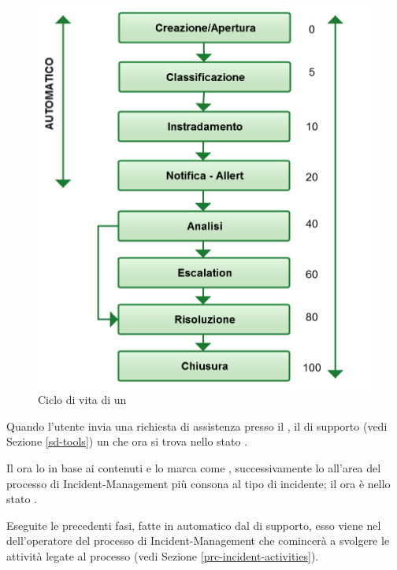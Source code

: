 \begin{figure}[htbp]
\centering
\includegraphics[scale=0.4]{Images/Diagrams/Ticket_life_cycle.png}
\caption{Ciclo di vita di un }
\label{prc-incident-status-img}
\end{figure}

Quando l'utente invia una richiesta di assistenza presso il , il  di supporto (vedi Sezione \ref{sd-tools})  un  che ora si trova nello stato .

Il  ora lo  in base ai contenuti e lo marca come , successivamente lo  all'area del processo di \ac{Incident-Management} più consona al tipo di incidente; il  ora è nello stato .

Eseguite le precedenti fasi, fatte in automatico dal  di supporto, esso viene  nel  dell'operatore del processo di \ac{Incident-Management} che comincerà a svolgere le attività legate al processo (vedi Sezione \ref{prc-incident-activities}).

